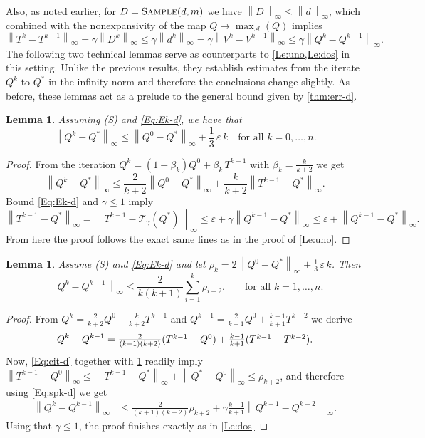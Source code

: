 \documentclass{article}
\newcommand{\cA}{\mathcal{A}}
\newcommand{\T}{\mathcal{T}}
\newcommand*{\infn}[1]{\left\|{#1}\right\|_{\infty}}
\renewcommand{\sp}[1]{\|{#1}\|_\text{\rm sp}}
\newcommand{\maxA}{\mbox{$\max_\cA$}}
\theoremstyle{plain}
\newtheorem{lemma}[theorem]{Lemma}
\theoremstyle{definition}
\theoremstyle{remark}
\begin{document}
Also, as noted earlier, for $D=\mbox{\sc Sample}(d,m)$ we have $\infn{D}\leq\infn{d}$, which combined with 
 the nonexpansivity of the map $Q\mapsto \maxA(Q)$ implies
\begin{equation}\label{Eq:spk-d}\infn{T^k-T^{k-1}}=\gamma \infn{D^k} \le \gamma \infn{d^k}=\gamma \infn{V^k-V^{k-1}}\le \gamma \infn{Q^{k}-Q^{k-1}}.
\end{equation}
The following two technical lemmas serve as counterparts to \cref{Le:uno,Le:dos} in this setting. Unlike the previous results, they establish estimates from the iterate $Q^k$ to $Q^*$ in the infinity norm and therefore the conclusions change slightly. As before, these lemmas act as a prelude to the general bound given by \cref{thm:err-d}.
\begin{lemma}\label{Le:uno-d}Assuming \mbox{\sc (S)} and \eqref{Eq:Ek-d}, we have that 
$$\infn{Q^k-Q^*}\leq \infn{Q^0-Q^*}+\frac{1}{3}\,\varepsilon\,k \quad \text{for all} \,\, k=0,\ldots,n.$$
\end{lemma}
\begin{proof}
From the iteration $Q^{k}=(1-\beta_k)Q^0+\beta_k\,T^{k-1}$ with $\beta_k=\frac{k}{k+2}$ we get
\begin{equation*}
    \infn{Q^{k}-Q^*}\le \mbox{$\frac{2}{k+2}\infn{Q^0-Q^*}+\frac{k}{k+2}\infn{T^{k-1}-Q^*}$}.
\end{equation*}
Bound \eqref{Eq:Ek-d} and $\gamma \le 1$ imply
    \begin{equation}\label{Eq:cit-d}
    \infn{T^{k-1}-Q^*}=\infn{T^{k-1}-\T_\gamma(Q^*)}\le \varepsilon+\gamma \infn{Q^{k-1}-Q^*}\le  \varepsilon+\infn{Q^{k-1}-Q^*}.
\end{equation}
From here the proof follows the exact same lines as in the proof of \cref{Le:uno}.
\end{proof}

\begin{lemma}\label{Le:dos-d} Assume \mbox{\sc (S)} and \eqref{Eq:Ek-d} and let $\rho_k=2\infn{Q^0-Q^*}+\frac{1}{3}\,\varepsilon\,k$. Then 
$$\infn{Q^{k}-Q^{k-1}} \le \frac{2}{k(k+1)}\sum_{i=1}^{k}\rho_{i+2}.\quad \quad \text{for all} \,\, k=1,\ldots,n.$$
\end{lemma}
\begin{proof}
From 
$Q^{k}=\frac{2}{k+2}Q^0+\frac{k}{k+2}T^{k-1}$ and
$Q^{k-1}=\frac{2}{k+1}Q^0+\frac{k-1}{k+1}T^{k-2}$
we derive
    \begin{equation*}
    Q^{k}-Q^{k-1}
    =\mbox{$ \frac{2}{(k+1)(k+2)}(T^{k-1}-Q^0) + \frac{k-1}{k+1}(T^{k-1}-T^{k-2})$}.
\end{equation*}
Now, \eqref{Eq:cit-d} together with \cref{Le:uno-d}  readily imply $\infn{T^{k-1}-Q^0}\leq \infn{T^{k-1}-Q^*} +\infn{Q^*-Q^0}\leq\rho_{k+2}$, 
and therefore using \eqref{Eq:spk-d} we get
\begin{align*}
    \infn{Q^{k}-Q^{k-1}} %
    &\le \mbox{$\frac{2}{(k+1)(k+2)}\rho_{k+2} +  \gamma\frac{k-1}{k+1}\infn{Q^{k-1}- Q^{k-2}}$}.
\end{align*}
Using that $\gamma\leq 1$, the proof finishes exactly as in \cref{Le:dos}
\end{proof}
\end{document}
